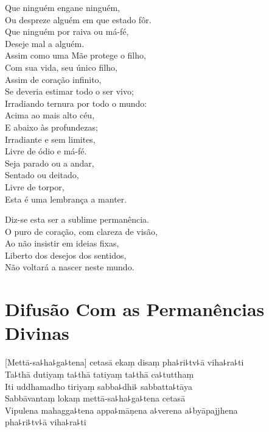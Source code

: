 Que ninguém engane ninguém,\\
Ou despreze alguém em que estado fôr.\\
Que ninguém por raiva ou má-fé,\\
Deseje mal a alguém.\\
Assim como uma Mãe protege o filho,\\
Com sua vida, seu único filho,\\
Assim de coração infinito,\\
Se deveria estimar todo o ser vivo;\\
Irradiando ternura por todo o mundo:\\
Acima ao mais alto céu,\\
E abaixo às profundezas;\\
Irradiante e sem limites,\\
Livre de ódio e má-fé.\\
Seja parado ou a andar,\\
Sentado ou deitado,\\
Livre de torpor,\\
Esta é uma lembrança a manter.

Diz-se esta ser a sublime permanência.\\
O puro de coração, com clareza de visão,\\
Ao não insistir em ideias fixas,\\
Liberto dos desejos dos sentidos,\\
Não voltará a nascer neste mundo.

\chapter*[Permanências Divinas]{Difusão Com as Permanências Divinas }

\delegateSetUseNext


\begin{leader}
\end{leader}

[Mettā-sa꜕ha꜕ga꜕tena] cetasā ekaṃ disaṃ pha꜕ri꜕tv꜕ā viha꜕ra꜕ti\\
Ta꜕thā dutiyaṃ ta꜕thā tatiyaṃ ta꜕thā ca꜕tutthaṃ\\
Iti uddhamadho tiriyaṃ sabba꜕dhi꜕ sabbatta꜕tāya\\
Sabbāvantaṃ lokaṃ mettā-sa꜕ha꜕ga꜕tena cetasā\\
Vipulena mahagga꜕tena appa꜕māṇena a꜕verena a꜕byāpajjhena\\
\vin pha꜕ri꜕tv꜕ā viha꜕ra꜕ti

